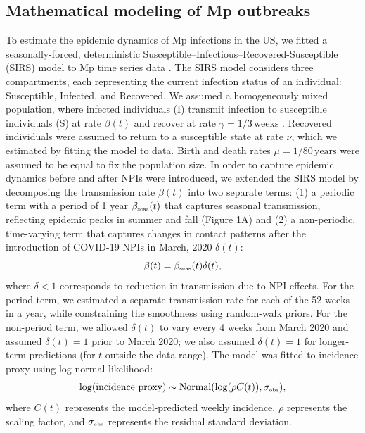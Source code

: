 \documentclass[12pt]{article}
\newcommand{\tsub}[2]{#1_{{\textrm{\tiny #2}}}}
\begin{document}
\subsection{Mathematical modeling of Mp outbreaks}

To estimate the epidemic dynamics of Mp infections in the US, we fitted a seasonally-forced, deterministic Susceptible–Infectious–Recovered-Susceptible (SIRS) model to Mp time series data \citep{dushoff2004dynamical,shaman2010absolute}.
The SIRS model considers three compartments, each representing the current infection status of an individual: Susceptible, Infected, and Recovered.
We assumed a homogeneously mixed population, where infected individuals (I) transmit infection to susceptible individuals (S) at rate $\beta(t)$ and recover at rate $\gamma=1/3\,\textrm{weeks}$ \citep{omori2015determinant}.
Recovered individuals were assumed to return to a susceptible state at rate $\nu$, which we estimated by fitting the model to data.
Birth and death rates $\mu=1/80\,\textrm{years}$ were assumed to be equal to fix the population size.
In order to capture epidemic dynamics before and after NPIs were introduced, we extended the SIRS model by decomposing the transmission rate $\beta(t)$ into two separate terms: (1) a periodic term with a period of 1 year $\tsub{\beta}{seas}(t)$ that captures seasonal transmission, reflecting epidemic peaks in summer and fall (Figure 1A) and (2) a non-periodic, time-varying term that captures changes in contact patterns after the introduction of COVID-19 NPIs in March, 2020 $\delta(t)$:
\begin{equation}
\beta(t) = \tsub{\beta}{seas}(t) \delta(t),
\end{equation}
where $\delta < 1$ corresponds to reduction in transmission due to NPI effects.
For the period term, we estimated a separate transmission rate for each of the 52 weeks in a year, while constraining the smoothness using random-walk priors.
For the non-period term, we allowed $\delta(t)$ to vary every 4 weeks from March 2020 and assumed $\delta(t)=1$ prior to March 2020; we also assumed $\delta(t)=1$ for longer-term predictions (for $t$ outside the data range).
The model was fitted to incidence proxy using log-normal likelihood:
\begin{equation}
\log (\textrm{incidence proxy}) \sim \mathrm{Normal}(\log (\rho C(t)), \tsub{\sigma}{obs}),
\end{equation}
where $C(t)$ represents the model-predicted weekly incidence, $\rho$ represents the scaling factor, and $\tsub{\sigma}{obs}$ represents the residual standard deviation.
\end{document}
